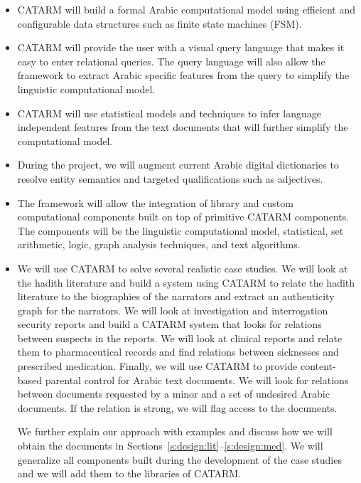 \documentclass[12pt]{article}
\begin{document}
\begin{itemize}\itemsep0pt
\item CATARM will build a formal Arabic computational model
using efficient and configurable data structures such as 
finite state machines (FSM). 
\item CATARM will provide the user with a visual query 
language that makes it easy to enter relational queries. 
The query language will also allow the framework to extract Arabic
specific features from the query to simplify the linguistic 
computational model. 
\item CATARM will use statistical models and techniques
to infer language independent features from the text documents
that will further simplify the computational model. 
\item During the project, we will augment current Arabic digital 
dictionaries to resolve entity semantics and targeted 
qualifications such as adjectives.
\item The framework will allow the integration of library and 
custom computational components built on top of primitive
CATARM components. 
The components will be the linguistic computational model,
statistical, set arithmetic, logic,
graph analysis techniques, and  text algorithms.
\item We will use CATARM to solve several realistic case studies.
We will look at the hadith literature and build a system using
CATARM to relate the hadith literature to the biographies of the
narrators and extract an authenticity graph for the narrators.
We will look at investigation and interrogation security reports
and build a CATARM system that looks for relations between suspects
in the reports. 
We will look at clinical reports and relate them to pharmaceutical 
records and find relations between sicknesses and prescribed medication. 
Finally, we will use CATARM to provide content-based parental control
for Arabic text documents. We will look for 
relations between documents requested by a minor and
a set of undesired Arabic documents. 
If the relation is strong, we will flag access to
the documents. 

We further explain our approach with examples and discuss 
how we will obtain the documents 
in Sections~\ref{s:design:lit}--\ref{s:design:med}.
We will generalize all components built during the development 
of the case studies and we will add them to 
the libraries of CATARM. 
\end{itemize}
\end{document}

